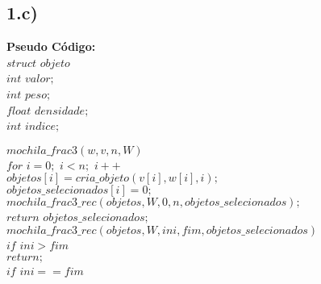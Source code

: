 \documentclass[10pt,a4paper]{article}
\begin{document}
   \subsection*{1.c)}
   
   \textbf{Pseudo Código: }\\
	
	$struct$ $objeto${\\
	
	\hspace{1cm}$int$ $valor;$\\
	
	\hspace{1cm}$int$ $peso;$\\
	
	\hspace{1cm}$float$ $densidade;$\\
	
	\hspace{1cm}$int$ $indice;$\\
	
	}
	
	$mochila\_frac3(w,v,n,W)$\\

	\hspace{1cm}$for$ $i=0;$ $i<n;$ $i++$\\

	\hspace{2cm}$objetos[i] = cria\_objeto(v[i],w[i],i);$\\
	
	\hspace{2cm}$objetos\_selecionados[i] = 0;$\\

	\hspace{1cm}$mochila\_frac3\_rec(objetos, W, 0, n, objetos\_selecionados);$\\

	\hspace{1cm}$return$ $objetos\_selecionados;$\\
	
	
	$mochila\_frac3\_rec(objetos,W,ini,fim, objetos\_selecionados)$\\

	\hspace{1cm}$if$ $ini > fim$\\

	\hspace{2cm}$return;$\\
	

	\hspace{1cm}$if$ $ini == fim$\\
\end{document}
